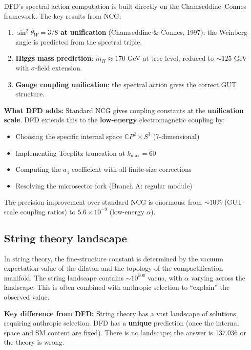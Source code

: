 \documentclass[12pt,a4paper]{article}
\newcommand{\CP}{\mathbb{C}P}
\begin{document}
DFD's spectral action computation is built directly on the Chamseddine--Connes framework. The key results from NCG:

\begin{enumerate}
\item \textbf{$\sin^2\theta_W = 3/8$ at unification} (Chamseddine \& Connes, 1997): the Weinberg angle is predicted from the spectral triple.
\item \textbf{Higgs mass prediction}: $m_H \approx 170$ GeV at tree level, reduced to $\sim 125$ GeV with $\sigma$-field extension.
\item \textbf{Gauge coupling unification}: the spectral action gives the correct GUT structure.
\end{enumerate}

\textbf{What DFD adds:} Standard NCG gives coupling constants at the \textbf{unification scale}. DFD extends this to the \textbf{low-energy} electromagnetic coupling by:
\begin{itemize}
\item Choosing the specific internal space $\CP^2 \times S^3$ (7-dimensional)
\item Implementing Toeplitz truncation at $k_{\max} = 60$
\item Computing the $a_4$ coefficient with all finite-size corrections
\item Resolving the microsector fork (Branch A: regular module)
\end{itemize}

The precision improvement over standard NCG is enormous: from $\sim 10\%$ (GUT-scale coupling ratios) to $5.6 \times 10^{-9}$ (low-energy $\alpha$).

\subsection{String theory landscape}

In string theory, the fine-structure constant is determined by the vacuum expectation value of the dilaton and the topology of the compactification manifold. The string landscape contains $\sim 10^{500}$ vacua, with $\alpha$ varying across the landscape. This is often combined with anthropic selection to ``explain'' the observed value.

\textbf{Key difference from DFD:} String theory has a vast landscape of solutions, requiring anthropic selection. DFD has a \textbf{unique} prediction (once the internal space and SM content are fixed). There is no landscape; the answer is 137.036 or the theory is wrong.
\end{document}

